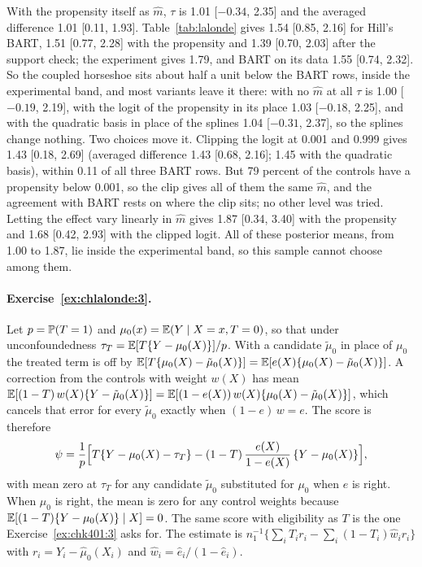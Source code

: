With the propensity itself as $\hat m$, $\tau$ is 1.01 [$-0.34$, 2.35] and the averaged difference 1.01 [0.11, 1.93]. Table~\ref{tab:lalonde} gives 1.54 [0.85, 2.16] for Hill's BART, 1.51 [0.77, 2.28] with the propensity and 1.39 [0.70, 2.03] after the support check; the experiment gives 1.79, and BART on its data 1.55 [0.74, 2.32]. So the coupled horseshoe sits about half a unit below the BART rows, inside the experimental band, and most variants leave it there: with no $\hat m$ at all $\tau$ is 1.00 [$-0.19$, 2.19], with the logit of the propensity in its place 1.03 [$-0.18$, 2.25], and with the quadratic basis in place of the splines 1.04 [$-0.31$, 2.37], so the splines change nothing. Two choices move it. Clipping the logit at 0.001 and 0.999 gives 1.43 [0.18, 2.69] (averaged difference 1.43 [0.68, 2.16]; 1.45 with the quadratic basis), within 0.11 of all three BART rows. But 79 percent of the controls have a propensity below 0.001, so the clip gives all of them the same $\hat m$, and the agreement with BART rests on where the clip sits; no other level was tried. Letting the effect vary linearly in $\hat m$ gives 1.87 [0.34, 3.40] with the propensity and 1.68 [0.42, 2.93] with the clipped logit. All of these posterior means, from 1.00 to 1.87, lie inside the experimental band, so this sample cannot choose among them.

\paragraph{Exercise~\ref{ex:chlalonde:3}.} Let $p = \mathbb{P}(T = 1)$ and $\mu_0(x) = \mathbb{E}(Y \mid X = x, T = 0)$, so that under unconfoundedness $\tau_T = \mathbb{E}[T\{Y - \mu_0(X)\}]/p$. With a candidate $\tilde\mu_0$ in place of $\mu_0$ the treated term is off by $\mathbb{E}[T\{\mu_0(X) - \tilde\mu_0(X)\}] = \mathbb{E}[e(X)\{\mu_0(X) - \tilde\mu_0(X)\}]$. A correction from the controls with weight $w(X)$ has mean $\mathbb{E}[(1 - T)\,w(X)\{Y - \tilde\mu_0(X)\}] = \mathbb{E}[(1 - e(X))\,w(X)\{\mu_0(X) - \tilde\mu_0(X)\}]$, which cancels that error for every $\tilde\mu_0$ exactly when $(1 - e)\,w = e$. The score is therefore
\[
\psi = \frac1p\Bigl[T\{Y - \mu_0(X) - \tau_T\} - (1 - T)\,\frac{e(X)}{1 - e(X)}\,\{Y - \mu_0(X)\}\Bigr],
\]
with mean zero at $\tau_T$ for any candidate $\tilde\mu_0$ substituted for $\mu_0$ when $e$ is right. When $\mu_0$ is right, the mean is zero for any control weights because $\mathbb{E}[(1 - T)\{Y - \mu_0(X)\} \mid X] = 0$. The same score with eligibility as $T$ is the one Exercise~\ref{ex:chk401:3} asks for. The estimate is $n_1^{-1}\{\sum_i T_i r_i - \sum_i (1 - T_i)\hat w_i r_i\}$ with $r_i = Y_i - \hat\mu_0(X_i)$ and $\hat w_i = \hat e_i/(1 - \hat e_i)$.

